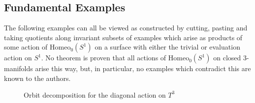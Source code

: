 \documentclass[10pt, oneside]{article}
\newcommand{\homeo}[1][S^1]{\text{Homeo}_0(#1)}
\theoremstyle{definition}
\theoremstyle{definition}
\begin{document}
\subsection{Fundamental Examples}
The following examples can all be viewed as constructed by cutting, pasting and taking quotients along invariant subsets of examples which arise as products of some action of $\homeo[S^1]$ on a surface with either the trivial or evaluation action on $S^1$. No theorem is proven that all actions of $\homeo[S^1]$ on closed 3-manifolds arise this way, but, in particular, no examples which contradict this are known to the authors. 

\begin{figure}
    \centering
    
    \caption{Orbit decomposition for the diagonal action on $T^3$}
    \label{fig:3torusdiagonalaction}
\end{figure}
\end{document}
